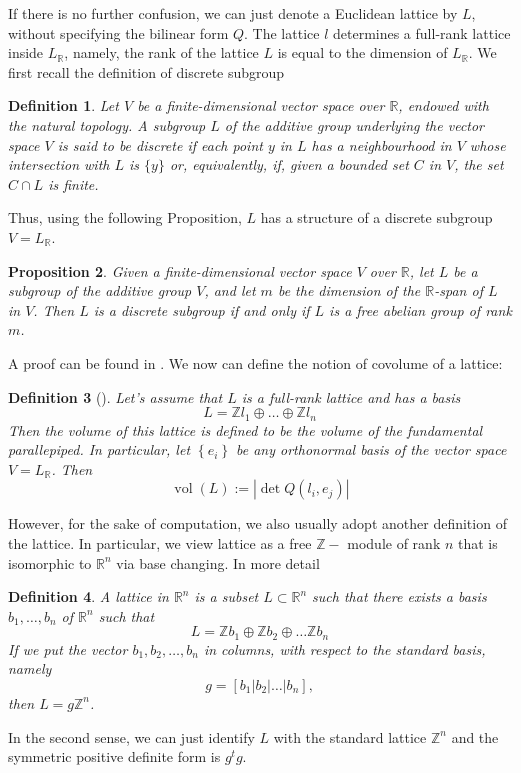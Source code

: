 \documentclass[12pt]{article} %
\newtheorem{definition}{Definition}[section]
\newtheorem{prop}[definition]{Proposition}
\DeclareMathOperator{\vol}{vol}
\begin{document}
If there is no further confusion, we can just denote a Euclidean lattice by $L$, without specifying the bilinear form
$Q$. The lattice $l$ determines a full-rank lattice inside $L_\mathbb{R}$, namely, the rank
of the lattice $L$ is equal to the dimension of $L_\mathbb{R}$. We first recall the definition of discrete subgroup
\begin{definition}
    Let $V$ be a finite-dimensional vector space over $\mathbb{R}$, endowed with the natural topology. A subgroup $L$ of the additive group underlying the vector space $V$ is said to be \textit{discrete} if each point $y$ in $L$ has a neighbourhood in $V$ whose intersection with $L$ is $\{y\}$ or, equivalently, if, given a bounded set $C$ in $V$, the set $C \cap L$ is finite.
\end{definition}
Thus, using the following Proposition, $L$ has a structure of a discrete subgroup $V = L_\mathbb{R}$.
\begin{prop}
    Given a finite-dimensional vector space $V$ over $\mathbb{R}$, let $L$ be a subgroup of the additive group $V$, and let $m$ be the dimension of the $\mathbb{R}$-span of $L$ in $V$. Then $L$ is a discrete subgroup if and only if $L$ is a free abelian group of rank $m$.
\end{prop}
A proof can be found in \cite{}.
We now can define the notion of covolume of a lattice:
\begin{definition}[\label = Volume]\label{volume}
    Let's assume that $L$ is a full-rank lattice and has a basis
    \[L = \mathbb{Z}l_1 \oplus \ldots \oplus\mathbb{Z}l_n\]
    Then the volume of this lattice is defined to be the volume of the fundamental
    parallepiped. In particular, let $\left\lbrace e_i\right\rbrace$ be any orthonormal
    basis of the vector space $V = L_\mathbb{R}$. Then
    \[\vol(L) := \left|\det Q(l_i,e_j)\right|\]
\end{definition}
However, for the sake of computation, we also usually adopt another definition of the lattice.
In particular, we view lattice as a free $\mathbb{Z}-$ module of rank $n$ that is isomorphic
to $\mathbb{R}^n$ via base changing.
In more detail
\begin{definition}\label{lattice2}
    A \textit{lattice} in $\mathbb{R}^n$ is a subset $L \subset \mathbb{R}^n$ such that there exists
    a basis $b_1,\ldots,b_n$ of $\mathbb{R}^n$ such that
    \[L = \mathbb{Z}b_1\oplus \mathbb{Z}b_2\oplus \ldots \mathbb{Z}b_n\]
    If we put the vector $b_1,b_2,\ldots,b_n$ in columns, with respect to the standard basis, namely
    \[g = [b_1 | b_2 | \ldots | b_n] ,\]
    then $L = g\mathbb{Z}^n$.
\end{definition}
In the second sense, we can just identify $L$ with the standard lattice $\mathbb{Z}^n$ and the
symmetric positive definite form is $g^tg$.
\end{document}
